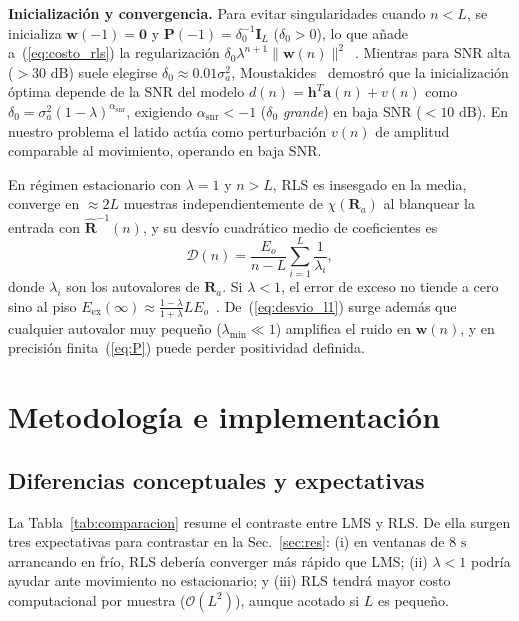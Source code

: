 \documentclass[conference]{IEEEtran}
\newcommand{\secUC}[1]{#1}
\newcommand{\secUC}[1]{\texorpdfstring{\MakeUppercase{#1}}{#1}}
\begin{document}
\textbf{Inicialización y convergencia.} Para evitar singularidades cuando $n<L$, se inicializa $\mathbf{w}(-1)=\mathbf{0}$ y $\mathbf{P}(-1)=\delta_0^{-1}\mathbf{I}_L$ ($\delta_0>0$), lo que añade a~(\ref{eq:costo_rls}) la regularización $\delta_0\lambda^{n+1}\lVert\mathbf{w}(n)\rVert^2$~\cite{ressl2026pas}. Mientras para SNR alta ($>30\text{ dB}$) suele elegirse $\delta_0\approx 0.01\sigma_a^2$, Moustakides~\cite{moustakides1997rls,ressl2026pas} demostró que la inicialización óptima depende de la SNR del modelo $d(n)=\mathbf{h}^T\mathbf{a}(n)+v(n)$ como $\delta_0=\sigma_a^2(1-\lambda)^{\alpha_{\text{snr}}}$, exigiendo $\alpha_{\text{snr}}<-1$ ($\delta_0$ \emph{grande}) en baja SNR ($<10\text{ dB}$). En nuestro problema el latido actúa como perturbación $v(n)$ de amplitud comparable al movimiento, operando en baja SNR.

En régimen estacionario con $\lambda=1$ y $n>L$, RLS es insesgado en la media, converge en $\approx 2L$ muestras independientemente de $\chi(\mathbf{R}_a)$ al blanquear la entrada con $\hat{\mathbf{R}}^{-1}(n)$, y su desvío cuadrático medio de coeficientes es~\cite{ressl2026pas}
\begin{equation}
\mathcal{D}(n)=\frac{E_o}{n-L}\sum_{i=1}^{L}\frac{1}{\lambda_i},
\label{eq:desvio_l1}
\end{equation}
donde $\lambda_i$ son los autovalores de $\mathbf{R}_a$. Si $\lambda<1$, el error de exceso no tiende a cero sino al piso $E_{\text{ex}}(\infty)\approx\frac{1-\lambda}{1+\lambda}LE_o$~\cite{ressl2026pas}. De~(\ref{eq:desvio_l1}) surge además que cualquier autovalor muy pequeño ($\lambda_{\min}\ll 1$) amplifica el ruido en $\mathbf{w}(n)$, y en precisión finita~(\ref{eq:P}) puede perder positividad definida.

\section{\secUC{Metodología e implementación}}
\label{sec:impl}

\subsection{Diferencias conceptuales y expectativas}

La Tabla~\ref{tab:comparacion} resume el contraste entre LMS y RLS. De ella surgen tres expectativas para contrastar en la Sec.~\ref{sec:res}: (i) en ventanas de $8\text{ s}$ arrancando en frío, RLS debería converger más rápido que LMS; (ii) $\lambda<1$ podría ayudar ante movimiento no estacionario; y (iii) RLS tendrá mayor costo computacional por muestra ($\mathcal{O}(L^2)$), aunque acotado si $L$ es pequeño.
\end{document}
